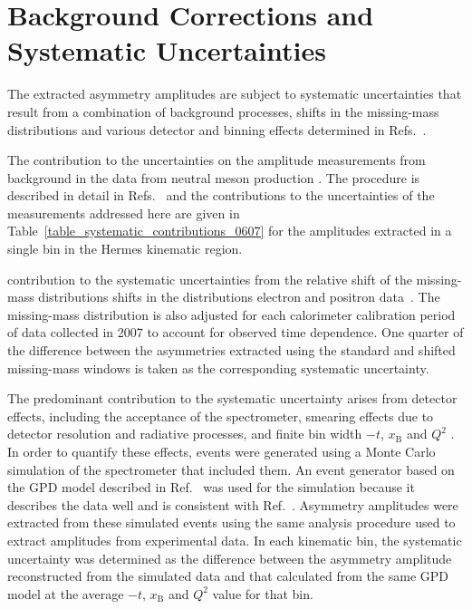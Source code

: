 \section{Background Corrections and Systematic Uncertainties}
The extracted asymmetry amplitudes are subject to systematic uncertainties that
result from a combination of background processes, 
shifts in the missing-mass distributions and various detector and binning
effects determined in  Refs.~\cite{Air08,Air09}.

The contribution to the uncertainties on the amplitude measurements
 from background in the data from neutral meson
production . The procedure is described in detail in
Refs.~\cite{Air08,Air09} and the contributions to the uncertainties of
the measurements addressed here are given in
Table~\ref{table_systematic_contributions_0607} for the amplitudes
extracted in a single bin in the H{\sc ermes} kinematic
region. 

 contribution to the systematic uncertainties from the relative shift of the
missing-mass distributions  shifts in the
distributions  electron and positron data~\cite{Zei09,Bur10}. The
missing-mass distribution is also adjusted for each calorimeter calibration period of data
collected in 2007 to account for  observed time dependence. One
quarter of the difference between the asymmetries extracted using the standard
and shifted missing-mass windows is taken as the corresponding systematic
uncertainty. 

The predominant contribution to the systematic uncertainty arises from detector
effects, including the acceptance of the spectrometer, smearing
effects due to detector resolution and radiative processes, and
 finite bin width  $-t$, $x_{\textrm{B}}$ and $Q^{2}$ . In order to quantify
these effects, events were generated using a Monte Carlo simulation of
the spectrometer that included them. An event
generator based on the GPD model described in Ref.~\cite{Guz06} was
used for the simulation because it describes the data well and is
consistent with Ref.~\cite{Air09}. Asymmetry amplitudes were extracted
from these simulated events using the same analysis procedure used to
extract amplitudes from experimental data. In each kinematic bin, the
systematic uncertainty was determined as the difference between the asymmetry amplitude reconstructed from the simulated data and that
calculated from the same GPD model at the average $-t$, $x_{\textrm{B}}$ and
$Q^{2}$ value for that bin.

